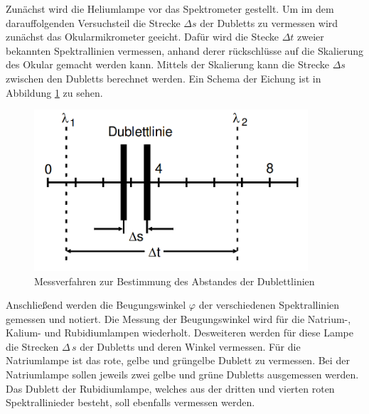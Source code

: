 Zunächst wird die Heliumlampe vor das Spektrometer gestellt. Um im dem darauffolgenden Versuchsteil die Strecke $\Delta s$ der Dubletts zu vermessen wird zunächst das Okularmikrometer geeicht. Dafür wird die Stecke $\Delta t$ zweier bekannten Spektrallinien vermessen, anhand derer rückschlüsse auf die Skalierung des Okular gemacht werden kann. Mittels der Skalierung kann die Strecke $\Delta s$ zwischen den Dubletts berechnet werden. Ein Schema der Eichung ist in Abbildung \ref{fig:dup} zu sehen.
\begin{figure}
  \centering
  \includegraphics[height=6cm]{picture/Duplet.png}
  \caption{Messverfahren zur Bestimmung des Abstandes der Dublettlinien \cite{sample}}
  \label{fig:dup}
\end{figure}
Anschließend werden die Beugungswinkel $\varphi$ der verschiedenen Spektrallinien gemessen und notiert. Die Messung der Beugungswinkel wird für die Natrium-, Kalium- und Rubidiumlampen wiederholt. Desweiteren werden für diese Lampe die Strecken $\Delta \, s$ der Dubletts und deren Winkel vermessen. Für die Natriumlampe ist das rote, gelbe und grüngelbe Dublett zu vermessen.  Bei der Natriumlampe sollen jeweils zwei gelbe und grüne Dubletts ausgemessen werden. Das Dublett der Rubidiumlampe, welches aus der dritten und vierten roten Spektrallinieder besteht, soll ebenfalls vermessen werden.

